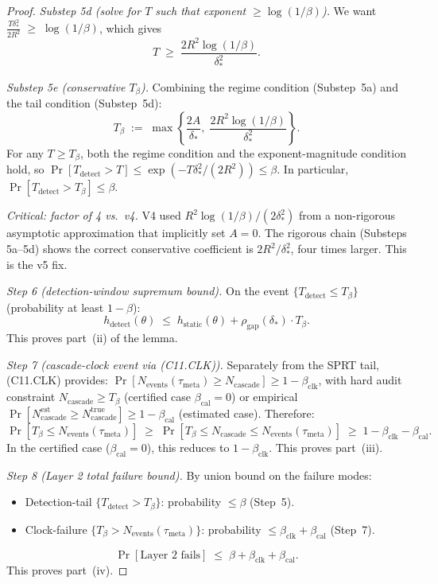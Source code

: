 \documentclass{article}
\newcommand{\deltastar}{\delta_{*}}
\newcommand{\rhogap}{\rho_{\mathrm{gap}}}
\newcommand{\Tbeta}{T_{\beta}}
\newcommand{\Ncasc}{N_{\mathrm{cascade}}}
\newcommand{\Nev}{N_{\mathrm{events}}}
\newcommand{\bclk}{\beta_{\mathrm{clk}}}
\newcommand{\bcal}{\beta_{\mathrm{cal}}}
\begin{document}
\begin{proof}
\emph{Substep 5d (solve for $T$ such that exponent $\geq \log(1/\beta)$).}
We want
$\frac{T \deltastar^2}{2 R^2} \;\geq\; \log(1/\beta)$,
which gives
\[
  T \;\geq\; \frac{2 R^2 \log(1/\beta)}{\deltastar^2}.
\]

\emph{Substep 5e (conservative $\Tbeta$).}  Combining the regime
condition (Substep~5a) and the tail condition (Substep~5d):
\[
  \Tbeta \;:=\; \max\!\left\{\frac{2A}{\deltastar},\;
  \frac{2R^2 \log(1/\beta)}{\deltastar^2}\right\}.
\]
For any $T \geq \Tbeta$, both the regime condition and the
exponent-magnitude condition hold, so $\Pr[T_{\mathrm{detect}} > T]
\leq \exp(-T\deltastar^2/(2R^2)) \leq \beta$.  In particular,
$\Pr[T_{\mathrm{detect}} > \Tbeta] \leq \beta$.

\emph{Critical: factor of 4 vs.\ v4.}  V4 used $R^2\log(1/\beta)/
(2\deltastar^2)$ from a non-rigorous asymptotic approximation that
implicitly set $A = 0$.  The rigorous chain (Substeps 5a--5d) shows
the correct conservative coefficient is $2R^2/\deltastar^2$, four
times larger.  This is the v5 fix.

\emph{Step 6 (detection-window supremum bound).}  On the event
$\{T_{\mathrm{detect}} \leq \Tbeta\}$ (probability at least
$1-\beta$):
\[
  h_{\mathrm{detect}}(\theta) \;\leq\;
  h_{\mathrm{static}}(\theta) + \rhogap(\deltastar) \cdot
  \Tbeta.
\]
This proves part~(ii) of the lemma.

\emph{Step 7 (cascade-clock event via (C11.CLK)).}  Separately
from the SPRT tail, (C11.CLK) provides:
$\Pr[\Nev(\tau_{\mathrm{meta}}) \geq \Ncasc] \geq 1 - \bclk$, with
hard audit constraint $\Ncasc \geq \Tbeta$ (certified case
$\bcal = 0$) or empirical $\Pr[\Ncasc^{\mathrm{est}} \geq
\Ncasc^{\mathrm{true}}] \geq 1 - \bcal$ (estimated case).
Therefore:
\[
  \Pr[\Tbeta \leq \Nev(\tau_{\mathrm{meta}})] \;\geq\;
  \Pr[\Tbeta \leq \Ncasc \leq \Nev(\tau_{\mathrm{meta}})]
  \;\geq\; 1 - \bclk - \bcal.
\]
In the certified case ($\bcal = 0$), this reduces to $1 - \bclk$.
This proves part~(iii).

\emph{Step 8 (Layer 2 total failure bound).}  By union bound on
the failure modes:
\begin{itemize}
\item Detection-tail $\{T_{\mathrm{detect}} > \Tbeta\}$:
  probability $\leq \beta$ (Step~5).
\item Clock-failure $\{\Tbeta > \Nev(\tau_{\mathrm{meta}})\}$:
  probability $\leq \bclk + \bcal$ (Step~7).
\end{itemize}
\[
  \Pr[\text{Layer~2 fails}] \;\leq\; \beta + \bclk + \bcal.
\]
This proves part~(iv).


\end{proof}
\end{document}
